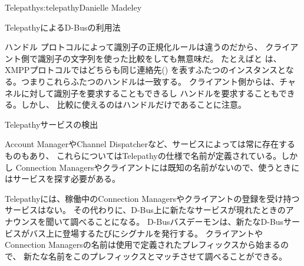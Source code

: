 \begin{aosachapter}{Telepathy}{s:telepathy}{Danielle Madeley}
\begin{aosasect1}{TelepathyによるD-Busの利用法}
\begin{aosasect2}{ハンドル}
プロトコルによって識別子の正規化ルールは違うのだから、
クライアント側で識別子の文字列を使った比較をしても無意味だ。
たとえばと
は、XMPPプロトコルではどちらも同じ連絡先()
を表すふたつのインスタンスとなる。つまりこれらふたつのハンドルは一致する。
クライアント側からは、チャネルに対して識別子を要求することもできるし
ハンドルを要求することもできる。しかし、
比較に使えるのはハンドルだけであることに注意。

\end{aosasect2}

\begin{aosasect2}{Telepathyサービスの検出}

Account ManagerやChannel Dispatcherなど、サービスによっては常に存在するものもあり、
これらについてはTelepathyの仕様で名前が定義されている。しかし
Connection Managersやクライアントには既知の名前がないので、使うときにはサービスを探す必要がある。

Telepathyには、稼働中のConnection Managersやクライアントの登録を受け持つサービスはない。
その代わりに、D-Bus上に新たなサービスが現れたときのアナウンスを聞いて調べることになる。
D-Busバスデーモンは、新たなD-Busサービスがバス上に登場するたびにシグナルを発行する。
クライアントやConnection Managersの名前は使用で定義されたプレフィックスから始まるので、
新たな名前をこのプレフィックスとマッチさせて調べることができる。


\end{aosasect2}
\end{aosasect1}
\end{aosachapter}
